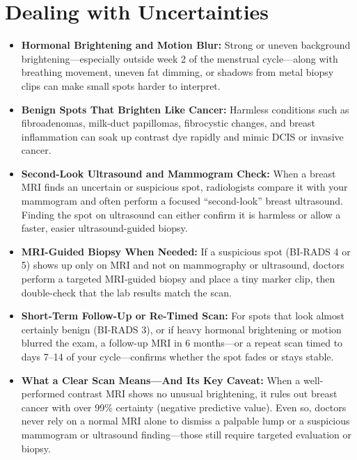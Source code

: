\section{Dealing with Uncertainties}
\begin{itemize}
\item \textbf{Hormonal Brightening and Motion Blur:} Strong or uneven background brightening---especially outside week 2 of the menstrual cycle---along with breathing movement, uneven fat dimming, or shadows from metal biopsy clips can make small spots harder to interpret.
\item \textbf{Benign Spots That Brighten Like Cancer:} Harmless conditions such as fibroadenomas, milk-duct papillomas, fibrocystic changes, and breast inflammation can soak up contrast dye rapidly and mimic DCIS or invasive cancer.
\item \textbf{Second-Look Ultrasound and Mammogram Check:} When a breast MRI finds an uncertain or suspicious spot, radiologists compare it with your mammogram and often perform a focused ``second-look'' breast ultrasound. Finding the spot on ultrasound can either confirm it is harmless or allow a faster, easier ultrasound-guided biopsy.
\item \textbf{MRI-Guided Biopsy When Needed:} If a suspicious spot (BI-RADS 4 or 5) shows up only on MRI and not on mammography or ultrasound, doctors perform a targeted MRI-guided biopsy and place a tiny marker clip, then double-check that the lab results match the scan.
\item \textbf{Short-Term Follow-Up or Re-Timed Scan:} For spots that look almost certainly benign (BI-RADS 3), or if heavy hormonal brightening or motion blurred the exam, a follow-up MRI in 6 months---or a repeat scan timed to days 7--14 of your cycle---confirms whether the spot fades or stays stable.
\item \textbf{What a Clear Scan Means---And Its Key Caveat:} When a well-performed contrast MRI shows no unusual brightening, it rules out breast cancer with over 99\% certainty (negative predictive value). Even so, doctors never rely on a normal MRI alone to dismiss a palpable lump or a suspicious mammogram or ultrasound finding---those still require targeted evaluation or biopsy.
\end{itemize}

